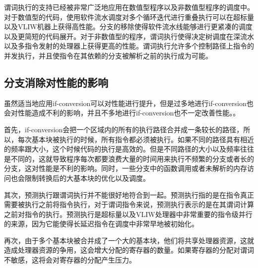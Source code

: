 谓词执行的支持已经被非常广泛地应用在数值型程序以及非数值型程序的调度中\cite{ScottA.Mahlke1992}。对于数值型的代码，使用软件流水调度对多个循环迭代进行重叠执行可以在超标量以及VLIW机器上获得高性能\cite{1989a}\cite{JosephP.Brutt}。分支的移除使得软件流水线能够进行更紧凑的调度以及更简短的代码展开。对于非数值型的程序，谓词执行使得决定树调度在深流水以及多指令发射的处理器上获得更高的性能\cite{Hsu1986}。谓词执行允许多个控制路径上指令的并发执行，并且使指令在其依赖的分支被解析之前的执行成为可能。

\subsection{分支消除对性能的影响}\label{sec:ifcvt_harm_performance}

虽然适当地应用if-conversion可以对性能进行提升，但是过多地进行if-conversion也会对性能造成不利的影响，并且不多地进行if-conversion也不一定改善性能。\cite{ScottA.Mahlke1992}\cite{Tian2010}。

首先，if-conversion会把一个区域内的所有的执行路径合并成一条较长的路径，所以，每次基本块被执行的时候，所有指令都必须被执行。如果不同的路径具有相近的频率跟大小，这个时候代码的执行是高效的。但是不同路径的大小以及频率往往是不同的，这就导致程序每次都要浪费大量的时间用来执行不频繁的分支或者长的分支，这对性能是不利的影响。同时，一些分支中的函数调用或者未解析的内存访问也会限制转换后的大基本块的优化以及调度。

其次，预测执行跟谓词执行并不能很好地符合到一起。预测执行指的是在指令真正需要被执行之前将指令执行，对于谓词指令来说，预测执行表示的是在其谓词计算之前对指令的执行。预测执行是超标量以及VLIW处理器中非常重要的指令级并行的来源，因为它能使得长延迟指令在调度中非常早地被初始化。

再次，由于多个基本块被合并成了一个大的基本块，他们将共享处理器资源，这就造成处理器资源的争用，这会增大分配的寄存器的数量。如果寄存器的分配对谓词不敏感，这将会对寄存器的分配产生压力\cite{Quinones2006}\cite{Quinones2007}。